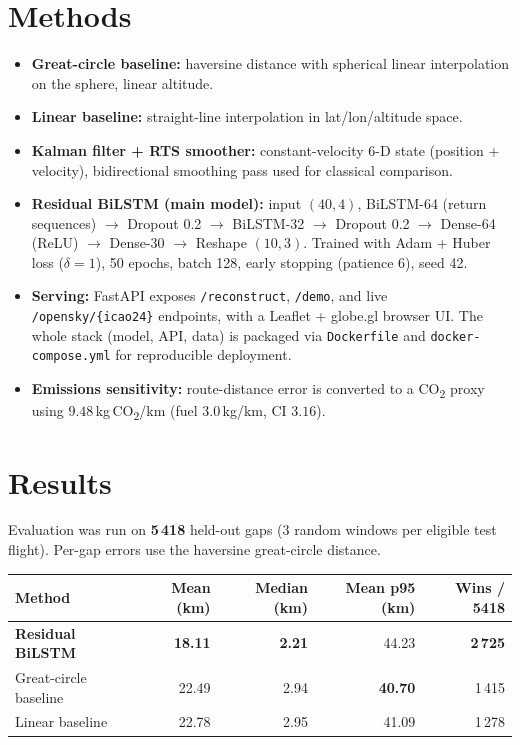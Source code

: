 \documentclass[11pt]{article}
\begin{document}
\section*{Methods}
\begin{itemize}
  \item \textbf{Great-circle baseline:} haversine distance with spherical linear interpolation on the sphere, linear altitude.
  \item \textbf{Linear baseline:} straight-line interpolation in lat/lon/altitude space.
  \item \textbf{Kalman filter + RTS smoother:} constant-velocity 6-D state (position + velocity), bidirectional smoothing pass used for classical comparison.
  \item \textbf{Residual BiLSTM (main model):} input $(40,4)$, BiLSTM-64 (return sequences) $\rightarrow$ Dropout 0.2 $\rightarrow$ BiLSTM-32 $\rightarrow$ Dropout 0.2 $\rightarrow$ Dense-64 (ReLU) $\rightarrow$ Dense-30 $\rightarrow$ Reshape $(10,3)$. Trained with Adam + Huber loss ($\delta=1$), 50 epochs, batch 128, early stopping (patience 6), seed 42.
  \item \textbf{Serving:} FastAPI exposes \texttt{/reconstruct}, \texttt{/demo}, and live \texttt{/opensky/\{icao24\}} endpoints, with a Leaflet + globe.gl browser UI. The whole stack (model, API, data) is packaged via \texttt{Dockerfile} and \texttt{docker-compose.yml} for reproducible deployment.
  \item \textbf{Emissions sensitivity:} route-distance error is converted to a CO\textsubscript{2} proxy using $9.48$\,kg\,CO\textsubscript{2}/km (fuel $3.0$\,kg/km, CI $3.16$).
\end{itemize}

\section*{Results}
Evaluation was run on \textbf{5\,418} held-out gaps (3 random windows per eligible test flight). Per-gap errors use the haversine great-circle distance.

\begin{center}
\small
\begin{tabular}{lrrrr}
\toprule
\textbf{Method} & \textbf{Mean (km)} & \textbf{Median (km)} & \textbf{Mean p95 (km)} & \textbf{Wins / 5418} \\
\midrule
\textbf{Residual BiLSTM} & \textbf{18.11} & \textbf{2.21} & 44.23 & \textbf{2\,725} \\
Great-circle baseline   & 22.49 & 2.94 & \textbf{40.70} & 1\,415 \\
Linear baseline         & 22.78 & 2.95 & 41.09 & 1\,278 \\
\bottomrule
\end{tabular}
\end{center}
\end{document}
